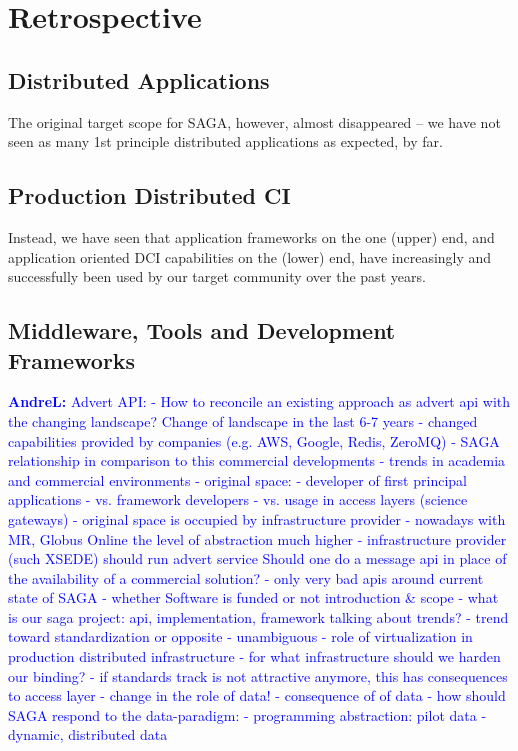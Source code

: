 \documentclass{article}
\newcommand{\B}[1]{\textbf{#1}}
\newcommand{\alnote}[1]{{\textcolor{blue}{    \B{AndreL:  } #1 }}}
\newcommand{\alnote}[1]{}
\begin{document}
\section{Retrospective}

\subsection{Distributed Applications}

The original target scope for SAGA, however, almost disappeared -- we
have not seen as many 1st principle distributed applications as
expected, by far.


\subsection{Production Distributed CI}

Instead, we have seen that application frameworks on the one (upper)
end, and application oriented DCI capabilities on the (lower) end,
have increasingly and successfully been used by our target community
over the past years.


\subsection{Middleware, Tools and Development Frameworks}

\alnote{Advert API: - How to reconcile an existing approach as advert
  api with the changing landscape?  Change of landscape in the last
  6-7 years - changed capabilities provided by companies (e.g. AWS,
  Google, Redis, ZeroMQ) - SAGA relationship in comparison to this
  commercial developments - trends in academia and commercial
  environments - original space: - developer of first principal
  applications - vs. framework developers - vs. usage in access layers
  (science gateways) - original space is occupied by infrastructure
  provider - nowadays with MR, Globus Online the level of abstraction
  much higher - infrastructure provider (such XSEDE) should run advert
  service Should one do a message api in place of the availability of
  a commercial solution?  - only very bad apis around current state of
  SAGA - whether Software is funded or not introduction \& scope -
  what is our saga project: api, implementation, framework talking
  about trends?  - trend toward standardization or opposite -
  unambiguous - role of virtualization in production distributed
  infrastructure - for what infrastructure should we harden our
  binding?  - if standards track is not attractive anymore, this has
  consequences to access layer - change in the role of data!  -
  consequence of of data - how should SAGA respond to the
  data-paradigm: - programming abstraction: pilot data - dynamic,
  distributed data }
\end{document}
